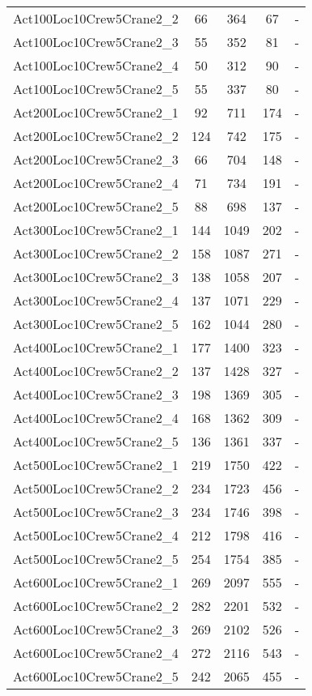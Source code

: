 \begin{center}
\begin{longtable}{ | l | c | c | c | c | }
Act100Loc10Crew5Crane2\_2	&	66	&	364	&	67	&	-	\\	
Act100Loc10Crew5Crane2\_3	&	55	&	352	&	81	&	-	\\	
Act100Loc10Crew5Crane2\_4	&	50	&	312	&	90	&	-	\\	
Act100Loc10Crew5Crane2\_5	&	55	&	337	&	80	&	-	\\	
Act200Loc10Crew5Crane2\_1	&	92	&	711	&	174	&	-	\\	
Act200Loc10Crew5Crane2\_2	&	124	&	742	&	175	&	-	\\	
Act200Loc10Crew5Crane2\_3	&	66	&	704	&	148	&	-	\\	
Act200Loc10Crew5Crane2\_4	&	71	&	734	&	191	&	-	\\	
Act200Loc10Crew5Crane2\_5	&	88	&	698	&	137	&	-	\\	
Act300Loc10Crew5Crane2\_1	&	144	&	1049	&	202	&	-	\\	
Act300Loc10Crew5Crane2\_2	&	158	&	1087	&	271	&	-	\\	
Act300Loc10Crew5Crane2\_3	&	138	&	1058	&	207	&	-	\\	
Act300Loc10Crew5Crane2\_4	&	137	&	1071	&	229	&	-	\\	
Act300Loc10Crew5Crane2\_5	&	162	&	1044	&	280	&	-	\\	
Act400Loc10Crew5Crane2\_1	&	177	&	1400	&	323	&	-	\\	
Act400Loc10Crew5Crane2\_2	&	137	&	1428	&	327	&	-	\\	
Act400Loc10Crew5Crane2\_3	&	198	&	1369	&	305	&	-	\\	
Act400Loc10Crew5Crane2\_4	&	168	&	1362	&	309	&	-	\\	
Act400Loc10Crew5Crane2\_5	&	136	&	1361	&	337	&	-	\\		
Act500Loc10Crew5Crane2\_1	&	219	&	1750	&	422	&	-	\\	
Act500Loc10Crew5Crane2\_2	&	234	&	1723	&	456	&	-	\\	
Act500Loc10Crew5Crane2\_3	&	234	&	1746	&	398	&	-	\\	
Act500Loc10Crew5Crane2\_4	&	212	&	1798	&	416	&	-	\\	
Act500Loc10Crew5Crane2\_5	&	254	&	1754	&	385	&	-	\\	
Act600Loc10Crew5Crane2\_1	&	269	&	2097	&	555	&	-	\\	
Act600Loc10Crew5Crane2\_2	&	282	&	2201	&	532	&	-	\\	
Act600Loc10Crew5Crane2\_3	&	269	&	2102	&	526	&	-	\\	
Act600Loc10Crew5Crane2\_4	&	272	&	2116	&	543	&	-	\\	
Act600Loc10Crew5Crane2\_5	&	242	&	2065	&	455	&	-	\\	

\end{longtable}
\end{center}
